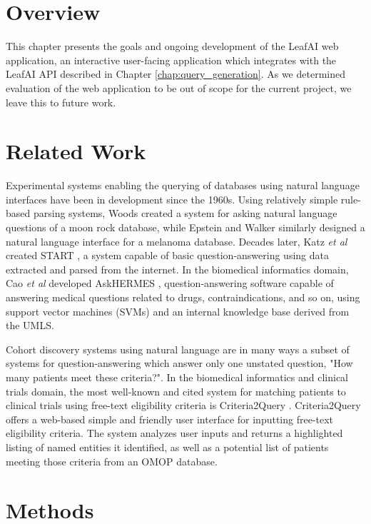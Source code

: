 \documentclass[../main.tex]{subfiles}
\begin{document}
\section{Overview}

This chapter presents the goals and ongoing development of the LeafAI web application, an interactive user-facing application which integrates with the LeafAI API described in Chapter \ref{chap:query_generation}. As we determined evaluation of the web application to be out of scope for the current project, we leave this to future work.

\section{Related Work}

Experimental systems enabling the querying of databases using natural language interfaces have been in development since the 1960s. Using relatively simple rule-based parsing systems, Woods \cite{woods1973progress} created a system for asking natural language questions of a moon rock database, while Epstein and Walker \cite{epstein1978natural} similarly designed a natural language interface for a melanoma database. Decades later, Katz \textit{et al} created START \cite{katz1999integrating}, a system capable of basic question-answering using data extracted and parsed from the internet. In the biomedical informatics domain, Cao \textit{et al} developed AskHERMES \cite{cao2011askhermes}, question-answering software capable of answering medical questions related to drugs, contraindications, and so on, using support vector machines (SVMs) and an internal knowledge base derived from the UMLS.

Cohort discovery systems using natural language are in many ways a subset of systems for question-answering which answer only one unstated question, "How many patients meet these criteria?". In the biomedical informatics and clinical trials domain, the most well-known and cited system for matching patients to clinical trials using free-text eligibility criteria is Criteria2Query \cite{yuan2019criteria2query, fang2022combining}. Criteria2Query offers a web-based simple and friendly user interface for inputting free-text eligibility criteria. The system analyzes user inputs and returns a highlighted listing of named entities it identified, as well as a potential list of patients meeting those criteria from an OMOP database.

\section{Methods}
\end{document}
